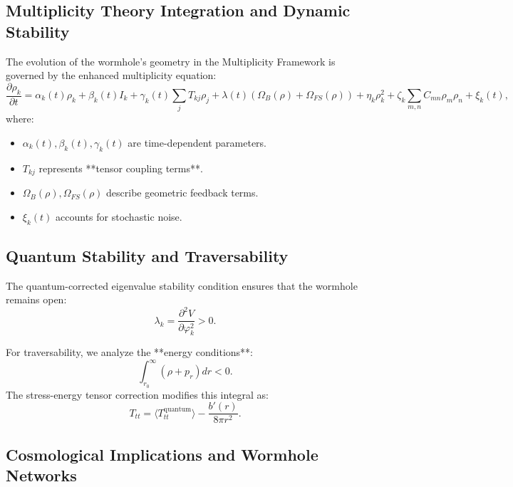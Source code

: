 \documentclass{article}
\theoremstyle{plain}
\begin{document}
\subsection{Multiplicity Theory Integration and Dynamic Stability}

The evolution of the wormhole’s geometry in the Multiplicity Framework is governed by the enhanced multiplicity equation:
\begin{equation}
\frac{\partial \rho_k}{\partial t} = \alpha_k(t) \rho_k + \beta_k(t) I_k + \gamma_k(t) \sum_j T_{kj} \rho_j + \lambda(t) (\Omega_B(\rho) + \Omega_{FS}(\rho)) + \eta_k \rho_k^2 + \zeta_k \sum_{m,n} C_{mn} \rho_m \rho_n + \xi_k(t),
\end{equation}
where:
\begin{itemize}
    \item $\alpha_k(t), \beta_k(t), \gamma_k(t)$ are time-dependent parameters.
    \item $T_{kj}$ represents **tensor coupling terms**.
    \item $\Omega_B(\rho), \Omega_{FS}(\rho)$ describe geometric feedback terms.
    \item $\xi_k(t)$ accounts for stochastic noise.
\end{itemize}

\subsection{Quantum Stability and Traversability}

The quantum-corrected eigenvalue stability condition ensures that the wormhole remains open:
\begin{equation}
\lambda_k = \frac{\partial^2 V}{\partial \varphi_k^2} > 0.
\end{equation}

For traversability, we analyze the **energy conditions**:
\begin{equation}
\int_{r_0}^{\infty} (\rho + p_r) dr < 0.
\end{equation}
The stress-energy tensor correction modifies this integral as:
\begin{equation}
T_{tt} = \langle T_{tt}^{\text{quantum}} \rangle - \frac{b'(r)}{8\pi r^2}.
\end{equation}

\subsection{Cosmological Implications and Wormhole Networks}
\end{document}
